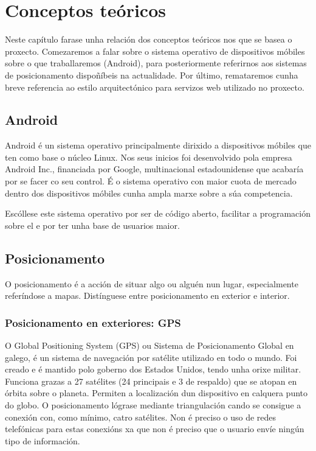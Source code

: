 \chapter{Conceptos teóricos}

Neste capítulo farase unha relación dos conceptos teóricos nos que se basea o proxecto. Comezaremos a falar sobre o sistema operativo de dispositivos móbiles sobre o que traballaremos (Android), para posteriormente referirnos aos sistemas de posicionamento dispoñíbeis na actualidade. Por último, remataremos cunha breve referencia ao estilo arquitectónico para servizos web utilizado no proxecto.


\section{Android}

Android \cite{android} é un sistema operativo principalmente dirixido a dispositivos móbiles que ten como base o núcleo Linux. Nos seus inicios foi desenvolvido pola empresa Android Inc., financiada por Google, multinacional estadounidense que acabaría por se facer co seu control. É o sistema operativo con maior cuota de mercado dentro dos dispositivos móbiles cunha ampla marxe sobre a súa competencia.

Escóllese este sistema operativo por ser de código aberto, facilitar a programación sobre el e por ter unha base de usuarios maior.

\section{Posicionamento}
O posicionamento é a acción de situar algo ou alguén nun lugar, especialmente referíndose a mapas. Distínguese entre posicionamento en exterior e interior.

\subsection{Posicionamento en exteriores: GPS}

O Global Positioning System (GPS) ou Sistema de Posicionamento Global en galego, é un sistema de navegación por satélite utilizado en todo o mundo. Foi creado e é mantido polo goberno dos Estados Unidos, tendo unha orixe militar. Funciona grazas a 27 satélites (24 principais e 3 de respaldo) que se atopan en órbita sobre o planeta. Permiten a localización dun dispositivo en calquera punto do globo. O posicionamento lógrase mediante triangulación cando se consigue a conexión con, como mínimo, catro satélites. Non é preciso o uso de redes telefónicas para estas conexións xa que non é preciso que o usuario envíe ningún tipo de información.

